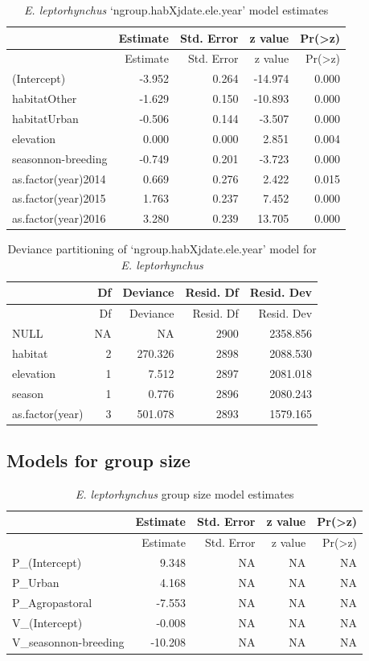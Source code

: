 \documentclass[]{article}
\begin{document}
\begin{longtable}[]{@{}lrrrr@{}}
\caption{\textit{E. leptorhynchus} `ngroup.habXjdate.ele.year' model
estimates}\tabularnewline
\toprule
& Estimate & Std. Error & z value &
Pr(\textgreater{}\textbar{}z\textbar{})\tabularnewline
\midrule
\endfirsthead
\toprule
& Estimate & Std. Error & z value &
Pr(\textgreater{}\textbar{}z\textbar{})\tabularnewline
\midrule
\endhead
(Intercept) & -3.952 & 0.264 & -14.974 & 0.000\tabularnewline
habitatOther & -1.629 & 0.150 & -10.893 & 0.000\tabularnewline
habitatUrban & -0.506 & 0.144 & -3.507 & 0.000\tabularnewline
elevation & 0.000 & 0.000 & 2.851 & 0.004\tabularnewline
seasonnon-breeding & -0.749 & 0.201 & -3.723 & 0.000\tabularnewline
as.factor(year)2014 & 0.669 & 0.276 & 2.422 & 0.015\tabularnewline
as.factor(year)2015 & 1.763 & 0.237 & 7.452 & 0.000\tabularnewline
as.factor(year)2016 & 3.280 & 0.239 & 13.705 & 0.000\tabularnewline
\bottomrule
\end{longtable}

\begin{longtable}[]{@{}lrrrr@{}}
\caption{Deviance partitioning of `ngroup.habXjdate.ele.year' model for
\textit{E. leptorhynchus}}\tabularnewline
\toprule
& Df & Deviance & Resid. Df & Resid. Dev\tabularnewline
\midrule
\endfirsthead
\toprule
& Df & Deviance & Resid. Df & Resid. Dev\tabularnewline
\midrule
\endhead
NULL & NA & NA & 2900 & 2358.856\tabularnewline
habitat & 2 & 270.326 & 2898 & 2088.530\tabularnewline
elevation & 1 & 7.512 & 2897 & 2081.018\tabularnewline
season & 1 & 0.776 & 2896 & 2080.243\tabularnewline
as.factor(year) & 3 & 501.078 & 2893 & 1579.165\tabularnewline
\bottomrule
\end{longtable}

\subsection{Models for group size}\label{models-for-group-size-1}

\begin{longtable}[]{@{}lrrrr@{}}
\caption{\textit{E. leptorhynchus} group size model
estimates}\tabularnewline
\toprule
& Estimate & Std. Error & z value &
Pr(\textgreater{}\textbar{}z\textbar{})\tabularnewline
\midrule
\endfirsthead
\toprule
& Estimate & Std. Error & z value &
Pr(\textgreater{}\textbar{}z\textbar{})\tabularnewline
\midrule
\endhead
P\_(Intercept) & 9.348 & NA & NA & NA\tabularnewline
P\_Urban & 4.168 & NA & NA & NA\tabularnewline
P\_Agropastoral & -7.553 & NA & NA & NA\tabularnewline
V\_(Intercept) & -0.008 & NA & NA & NA\tabularnewline
V\_seasonnon-breeding & -10.208 & NA & NA & NA\tabularnewline
\bottomrule
\end{longtable}
\end{document}
